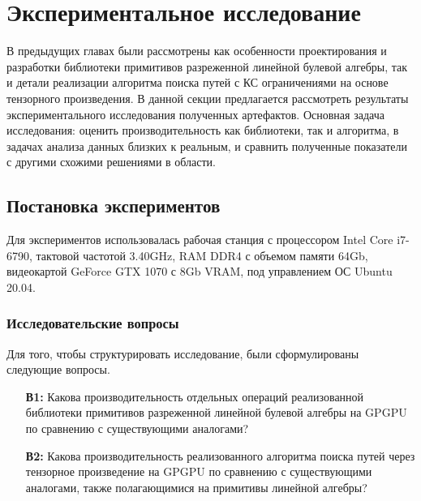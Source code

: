 \section{Экспериментальное исследование}

В предыдущих главах были рассмотрены как особенности проектирования и разработки библиотеки примитивов разреженной линейной булевой алгебры, 
так и детали реализации алгоритма поиска путей с КС ограничениями на основе тензорного произведения.
В данной секции предлагается рассмотреть результаты экспериментального исследования полученных артефактов.
Основная задача исследования: оценить производительность как библиотеки, так и алгоритма, в задачах анализа данных близких к реальным, и сравнить полученные показатели с другими схожими решениями в области.

\subsection{Постановка экспериментов}

Для экспериментов использовалась рабочая станция с процессором Intel Core i7-6790, тактовой частотой 3.40GHz, RAM DDR4 с объемом памяти 64Gb, видеокартой GeForce GTX 1070 с 8Gb VRAM, под управлением ОС Ubuntu 20.04.

\subsubsection*{Исследовательские вопросы}

Для того, чтобы структурировать исследование, были сформулированы следующие вопросы.

\begin{itemize}
   \item[\textbf{В1:}] Какова производительность отдельных операций реализованной библиотеки примитивов разреженной линейной булевой алгебры на GPGPU по сравнению с существующими аналогами?
   
   \item[\textbf{В2:}] Какова производительность реализованного алгоритма поиска путей через тензорное произведение на GPGPU  по сравнению с существующими аналогами, также полагающимися на примитивы линейной алгебры? 
\end{itemize}

